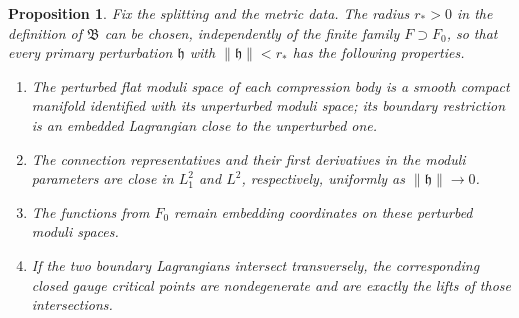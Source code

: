 \documentclass[11pt]{amsart}
\newtheorem{proposition}[theorem]{Proposition}
\theoremstyle{definition}
\theoremstyle{remark}
\theoremstyle{plain}
\numberwithin{equation}{section}
\begin{document}
\begin{proposition}\label{prop:small-ball}
Fix the splitting and the metric data. The radius
$r_*>0$ in the definition of $\mathfrak B$ can be
chosen, independently of the finite family
$F\supset F_0$, so that every primary perturbation
$\mathfrak h$ with $\|\mathfrak h\|<r_*$ has the
following properties.
\begin{enumerate}[label=(\roman*)]
\item The perturbed flat moduli space of each
compression body is a smooth compact manifold
identified with its unperturbed moduli space;
its boundary restriction is an embedded
Lagrangian close to the unperturbed one.
\item The connection representatives and their
first derivatives in the moduli parameters
are close in $L^2_1$ and $L^2$, respectively,
uniformly as $\|\mathfrak h\|\to0$.
\item The functions from $F_0$ remain embedding
coordinates on these perturbed moduli spaces.
\item If the two boundary Lagrangians intersect
transversely, the corresponding closed gauge
critical points are nondegenerate and are
exactly the lifts of those intersections.
\end{enumerate}
\end{proposition}
\end{document}

